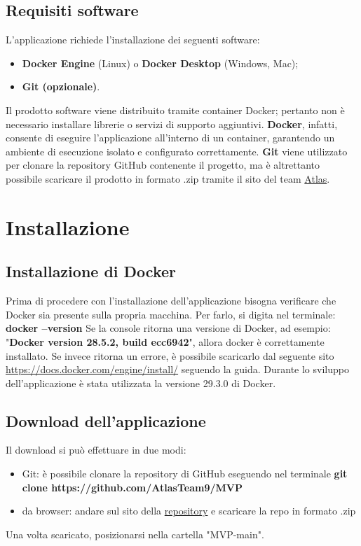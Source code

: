 \documentclass[a4paper,12pt]{article}
\begin{document}
    \subsection{Requisiti software}
        L'applicazione richiede l'installazione dei seguenti software:
        \begin{itemize}
            \item \textbf{Docker Engine} (Linux) o \textbf{Docker Desktop} (Windows, Mac);
            \item \textbf{Git (opzionale)}.
        \end{itemize}

        Il prodotto software viene distribuito tramite container Docker; pertanto non è necessario installare librerie o servizi di supporto aggiuntivi. \newline
        \textbf{Docker}, infatti, consente di eseguire l'applicazione all'interno di un container, garantendo un ambiente di esecuzione isolato e configurato correttamente.
        \textbf{Git} viene utilizzato per clonare la repository GitHub contenente il progetto, ma è altrettanto possibile scaricare il prodotto in formato .zip tramite il sito del team \href{https://atlasteam9.github.io/Atlas/}{Atlas}.
\newpage

\section{Installazione}
    \subsection{Installazione di Docker}    
        Prima di procedere con l'installazione dell'applicazione bisogna verificare che Docker sia presente sulla propria macchina. Per farlo, si digita nel terminale: \newline 
        \textbf{docker --version}\newline
        Se la console ritorna una versione di Docker, ad esempio: "\textbf{Docker version 28.5.2, build ecc6942}",
        allora docker è correttamente installato. Se invece ritorna un errore, è possibile scaricarlo dal seguente sito \url{https://docs.docker.com/engine/install/} seguendo la guida. Durante lo sviluppo dell'applicazione è stata utilizzata la versione 29.3.0 di Docker.
        \subsection{Download dell'applicazione}
        Il download si può effettuare in due modi:
        \begin{itemize}
        \item Git: è possibile clonare la repository di GitHub eseguendo nel terminale \newline \textbf{git clone https://github.com/AtlasTeam9/MVP}
        \item da browser: andare sul sito della \href{https://github.com/AtlasTeam9/MVP}{repository} e scaricare la repo in formato .zip
        \end{itemize}
        Una volta scaricato, posizionarsi nella cartella "MVP-main".
\end{document}
